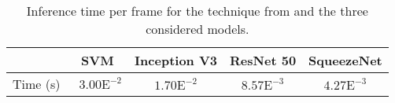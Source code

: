 \begin{table}[h]  %
	\renewcommand{\arraystretch}{1.3}	
	\centering
\setlength\tabcolsep{3pt}		
\caption{Inference time per frame for the technique from \cite{moccia_learning-based_2018} and the three considered models.}
\begin{tabular}{l cccc}
&  SVM \cite{moccia_learning-based_2018} & Inception V3   & ResNet 50  & SqueezeNet \\
\midrule
Time (s) & \ $3.00\mathrm{E}^{-2}$ & $1.70\mathrm{E}^{-2}$ & $8.57\mathrm{E}^{-3}$ & $4.27\mathrm{E}^{-3}$\\
\bottomrule
\end{tabular}
\label{tab_2_time}
\end{table}%

